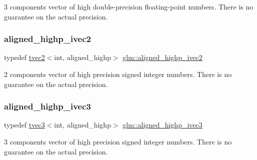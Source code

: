 3 components vector of high double-\/precision floating-\/point numbers. There is no guarantee on the actual precision. \mbox{\label{group__gtc__type__aligned_ga9fe485a34b77916c1817ab4ba2ad3b20}} 
\subsubsection{\texorpdfstring{aligned\+\_\+highp\+\_\+ivec2}{aligned\_highp\_ivec2}}
{\footnotesize\ttfamily typedef \hyperlink{structglm_1_1tvec2}{tvec2}$<$int, aligned\+\_\+highp$>$ \hyperlink{group__gtc__type__aligned_ga9fe485a34b77916c1817ab4ba2ad3b20}{glm\+::aligned\+\_\+highp\+\_\+ivec2}}

2 components vector of high precision signed integer numbers. There is no guarantee on the actual precision. \mbox{\label{group__gtc__type__aligned_gac7f1892e381baa066488c0b6d1bf16ad}} 
\subsubsection{\texorpdfstring{aligned\+\_\+highp\+\_\+ivec3}{aligned\_highp\_ivec3}}
{\footnotesize\ttfamily typedef \hyperlink{structglm_1_1tvec3}{tvec3}$<$int, aligned\+\_\+highp$>$ \hyperlink{group__gtc__type__aligned_gac7f1892e381baa066488c0b6d1bf16ad}{glm\+::aligned\+\_\+highp\+\_\+ivec3}}

3 components vector of high precision signed integer numbers. There is no guarantee on the actual precision. \mbox{\label{group__gtc__type__aligned_gadbe09d1af82957ec00a3baaa89120f1e}} 
